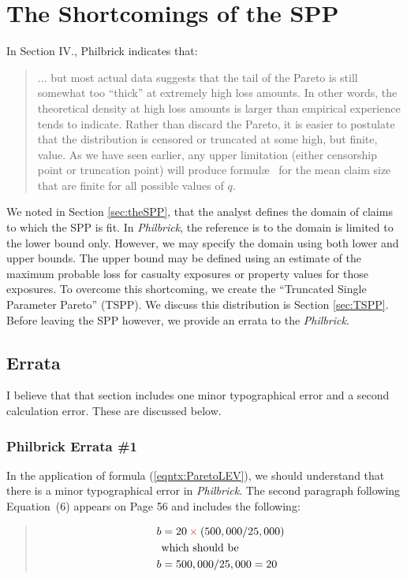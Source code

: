 \documentclass[]{article} %
\newcommand{\philbrick}{\textit{Philbrick}}
\begin{document}
\section{The Shortcomings of the SPP}

In Section IV., Philbrick indicates that:
\begin{quote}
	... but most actual data suggests that the tail of the Pareto is still somewhat too “thick” at extremely high loss amounts. In other words, the theoretical density at high loss amounts is larger than empirical experience tends to indicate. Rather than discard the Pareto, it is easier to postulate that the distribution is censored or truncated at some high, but finite, value. As we have seen earlier, any upper limitation (either censorship point or truncation point) will produce formul\ae~ for the mean claim size that are finite for all possible
	values of $q$. 
\end{quote}

We noted in Section \ref{sec:theSPP}, that the analyst defines the domain of claims to which the SPP is fit. In \philbrick, the reference is to the domain is limited to the lower bound only. However, we may specify the domain using both lower and upper bounds. The upper bound may be defined using an estimate of the maximum probable loss for casualty exposures or property values for those exposures. To overcome this shortcoming, we create the ``Truncated Single Parameter Pareto'' (TSPP). We discuss this distribution is Section \ref{sec:TSPP}. Before leaving the SPP however, we provide an errata to the \philbrick.

\subsection{Errata}
I believe that that section includes one minor typographical error and a second calculation error. These are discussed below.

\subsubsection{Philbrick Errata \#1}
	In the application of formula (\ref{eqntx:ParetoLEV}), we should understand that there is a minor typographical error in \philbrick. The second paragraph following Equation~(6) appears on Page 56 and includes the following:
	\begin{quote}
		\begin{align}
		b &= 20 \color{red}\times\color{black} (500,000/25,000)\nonumber\\
		&\text{which should be}\nonumber\\
		b &= 500,000/25,000 = 20\nonumber
		\end{align}
	\end{quote}
\end{document}
